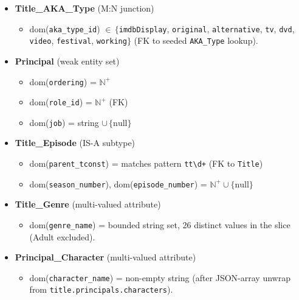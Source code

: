 \begin{itemize}
\begin{itemize}
    \item dom(\texttt{is\_original\_title}) = $\{0,1\}$
    \item dom(\texttt{attributes}) = string $\cup\,\{\text{null}\}$ (free-text qualifiers)
    \item dom(\texttt{region\_id}), dom(\texttt{language\_id}) = ISO code $\cup\,\{\text{null}\}$ (FK)
  \end{itemize}
  \item \textbf{Title\_AKA\_Type} (M:N junction)
  \begin{itemize}
    \item dom(\texttt{aka\_type\_id}) $\in\,\{$\texttt{imdbDisplay}, \texttt{original}, \texttt{alternative}, \texttt{tv}, \texttt{dvd}, \texttt{video}, \texttt{festival}, \texttt{working}$\}$ (FK to seeded \texttt{AKA\_Type} lookup).
  \end{itemize}
  \item \textbf{Principal} (weak entity set)
  \begin{itemize}
    \item dom(\texttt{ordering}) = $\mathbb{N}^+$
    \item dom(\texttt{role\_id}) = $\mathbb{N}^+$ (FK)
    \item dom(\texttt{job}) = string $\cup\,\{\text{null}\}$
  \end{itemize}
  \item \textbf{Title\_Episode} (IS-A subtype)
  \begin{itemize}
    \item dom(\texttt{parent\_tconst}) = matches pattern \texttt{tt\textbackslash d+} (FK to \texttt{Title})
    \item dom(\texttt{season\_number}), dom(\texttt{episode\_number}) = $\mathbb{N}^+ \cup \{\text{null}\}$
  \end{itemize}
  \item \textbf{Title\_Genre} (multi-valued attribute)
  \begin{itemize}
    \item dom(\texttt{genre\_name}) = bounded string set, 26 distinct values in the slice (Adult excluded).
  \end{itemize}
  \item \textbf{Principal\_Character} (multi-valued attribute)
  \begin{sloppypar}
  \begin{itemize}
    \item dom(\texttt{character\_name}) = non-empty string (after JSON-array unwrap from \texttt{title.principals.characters}).
  \end{itemize}
  \end{sloppypar}
\end{itemize}

